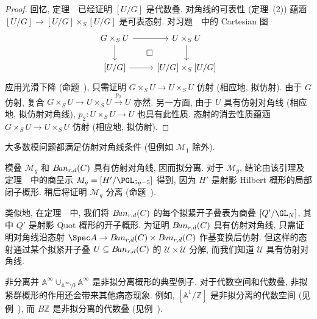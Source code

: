 \begin{proof}
回忆, 定理~~已经证明 $[U/G]$ 是代数叠. 对角线的可表性 (定理~(2)) 蕴涵 $[U/G]\to[U/G]\times_S[U/G]$ 是可表态射. 对习题~~中的 Cartesian 图
\[
\begin{tikzcd}
G\times_S U\arrow[r]\arrow[d]\arrow[dr,phantom,"\square"]&U\times_S U\arrow[d]\\
{[U/G]}\arrow[r]&{[U/G]\times_S[U/G]}
\end{tikzcd}
\]
应用光滑下降 (命题~), 只需证明 $G\times_S U\to U\times_S U$ 仿射 (相应地, 拟仿射). 由于 $G$ 仿射, 复合 $G\times_S U\to U\times_S U\xrightarrow{p_2}U$ 亦然. 另一方面, 由于 $U$ 具有仿射对角线 (相应地, 拟仿射对角线), $p_2:U\times_S U\to U$ 也具有此性质. 态射的消去性质蕴涵 $G\times_S U\to U\times_S U$ 仿射 (相应地, 拟仿射).
\end{proof}
大多数模问题都满足仿射对角线条件 (但例如 $\mathcal M_1$ 除外).
\begin{example}\label{src:4.3.15}
模叠 $\mathcal M_g$ 和 $B\!un_{r,d}(C)$ 具有仿射对角线, 因而拟分离. 对于 $\mathcal M_g$, 结论由该引理及定理~~中的商呈示 $\mathcal M_g=[H'/\PGL_{5g-5}]$ 得到, 因为 $H'$ 是射影 Hilbert 概形的局部闭子概形. 稍后将证明 $\mathcal M_g$ 分离 (命题~).

类似地, 在定理~~中, 我们将 $B\!un_{r,d}(C)$ 的每个拟紧开子叠表为商叠 $[Q'/\GL_N]$, 其中 $Q'$ 是射影 Quot 概形的开子概形. 为证明 $B\!un_{r,d}(C)$ 具有仿射对角线, 只需证明对角线沿态射 $\Spec A\to\cBun_{r,d}(C)\times\cBun_{r,d}(C)$ 作基变换后仿射. 但这样的态射通过某个拟紧开子叠 $U\subseteq B\!un_{r,d}(C)$ 的 $\mathcal U\times\mathcal U$ 分解, 而我们知道 $\mathcal U$ 具有仿射对角线.
\end{example}
\begin{example}\label{src:4.3.16}
非分离并 $\mathbb A^\infty\cup_{\mathbb A^\infty\setminus0}\mathbb A^\infty$ 是非拟分离概形的典型例子. 对于代数空间和代数叠, 非拟紧群概形的作用还会带来其他病态现象. 例如, $[\mathbb A^1/\mathbb Z]$ 是非拟分离的代数空间 (见例~), 而 $B\mathbb Z$ 是非拟分离的代数叠 (见例~).
\end{example}
